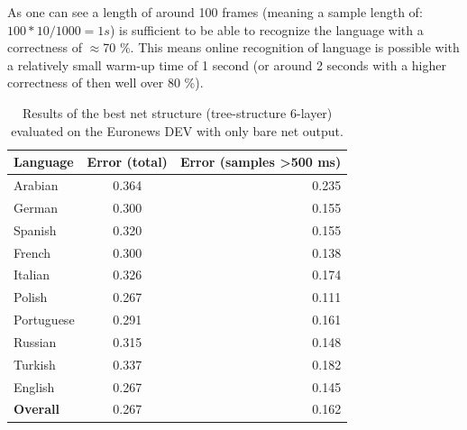 As one can see a length of around 100 frames (meaning a sample length of: \(100*10 / 1000 = 1s \)) is sufficient to be able to recognize the language with a correctness of \(\approx\)70 \%. This means online recognition of language is possible with a relatively small warm-up time of 1 second (or around 2 seconds with a higher correctness of then well over 80 \%).
\begin{figure}[h!]
\label{fig:lengthBasic}
\end{figure}
\begin{table}[h!]
\caption{Results of the best net structure (tree-structure 6-layer) evaluated on the Euronews DEV with only bare net output.}
\label{tab:bareResults}
\centering
\begin{tabular}{| l | c | r | }
	\hline
	\textbf{Language} & \textbf{Error (total)}  & \textbf{Error (samples >500 ms)} \\
	\hline
	Arabian & 0.364 &  0.235 \\
	German & 0.300 &  0.155 \\
	Spanish & 0.320 & 0.155 \\ 
	French & 0.300  & 0.138 \\
	Italian & 0.326  & 0.174 \\
	Polish & 0.267 & 0.111 \\
	Portuguese& 0.291 & 0.161 \\
	Russian&  0.315 & 0.148 \\
	Turkish&  0.337 & 0.182 \\
	English&  0.267 &0.145\\
	\hline
	\textbf{Overall} & 0.267 & 0.162\\
	\hline
\end{tabular}
\end{table}

